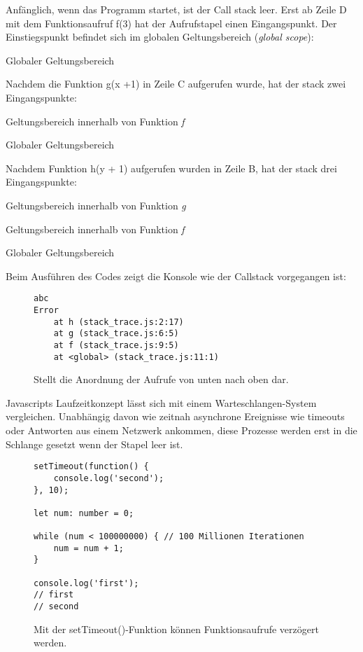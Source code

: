 \noindent
Anfänglich, wenn das Programm startet, ist der Call stack leer. Erst ab Zeile D mit dem Funktionsaufruf f(3) hat der Aufrufstapel einen Eingangspunkt. Der Einstiegspunkt befindet sich im globalen Geltungsbereich (\textit{global scope}):

\begin{description}
\item Globaler Geltungsbereich
\end{description}

\noindent
Nachdem die Funktion g(x +1) in Zeile C aufgerufen wurde, hat der stack zwei Eingangspunkte:

\begin{description}
\item Geltungsbereich innerhalb von Funktion \textit{f}
\item Globaler Geltungsbereich
\end{description}

\noindent
Nachdem Funktion h(y + 1) aufgerufen wurden in Zeile B, hat der stack drei Eingangspunkte:

\begin{description}
\item Geltungsbereich innerhalb von Funktion \textit{g}
\item Geltungsbereich innerhalb von Funktion \textit{f}
\item Globaler Geltungsbereich
\end{description}

\noindent
Beim Ausführen des Codes zeigt die Konsole wie der Callstack vorgegangen ist:

\begin{figure}[H]
\begin{lstlisting}
abc
Error
    at h (stack_trace.js:2:17)
    at g (stack_trace.js:6:5)
    at f (stack_trace.js:9:5)
    at <global> (stack_trace.js:11:1)
\end{lstlisting}
\caption{Stellt die Anordnung der Aufrufe von unten nach oben dar.}
\label{stack-trace-error}
\end{figure}

\noindent
Javascripts Laufzeitkonzept lässt sich mit einem Warteschlangen-System vergleichen. Unabhängig davon wie zeitnah asynchrone Ereignisse wie timeouts oder Antworten aus einem Netzwerk ankommen, diese Prozesse werden erst in die Schlange gesetzt wenn der Stapel leer ist.

\begin{figure}[H]
\begin{lstlisting}[basicstyle=\small]
setTimeout(function() {
    console.log('second');
}, 10);

let num: number = 0;

while (num < 100000000) { // 100 Millionen Iterationen
    num = num + 1;
}

console.log('first');
// first
// second
\end{lstlisting}
\caption{Mit der setTimeout()-Funktion können Funktionsaufrufe verzögert werden.}
\label{First-timeout-example}
\end{figure}

